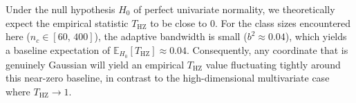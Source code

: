 Under the null hypothesis $H_0$ of perfect univariate normality, we theoretically expect the empirical statistic $T_{\mathrm{HZ}}$ to be close to $0$. For the class sizes encountered here ($n_c \in [60,\,400]$), the adaptive bandwidth is small ($b^2 \approx 0.04$), which yields a baseline expectation of $\mathbb{E}_{H_0}[T_{\mathrm{HZ}}] \approx 0.04$. Consequently, any coordinate that is genuinely Gaussian will yield an empirical $T_{\mathrm{HZ}}$ value fluctuating tightly around this near-zero baseline, in contrast to the high-dimensional multivariate case where $T_{\mathrm{HZ}} \to 1$.